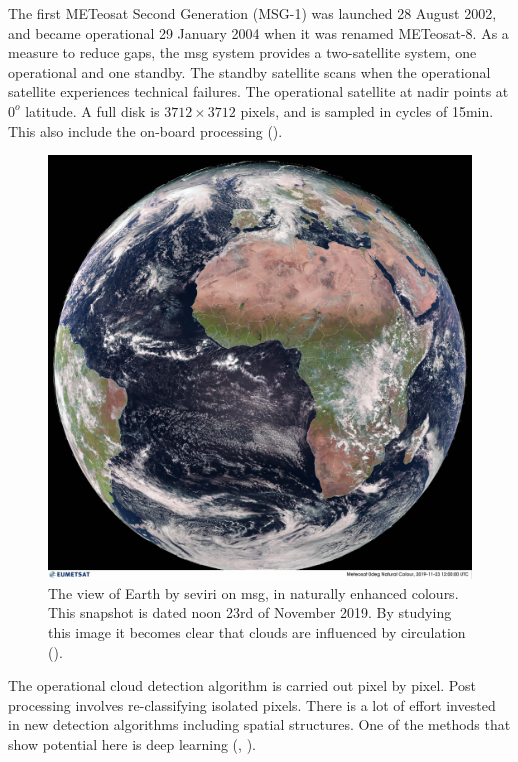 The first METeosat Second Generation (MSG-1) was launched 28 August 2002, and became operational 29 January 2004 when it was renamed METeosat-8. As a measure to reduce gaps, the \acrshort{msg} system provides a two-satellite system, one operational and one standby. The standby satellite scans when the operational satellite experiences technical failures. 
The operational satellite at nadir points at $0^o$ latitude. A full disk is $3712\times 3712$ pixels, and is sampled in cycles of 15min. This also include the on-board processing (\cite{Schmetz_meteosat_intro}).

\begin{figure}[h]
    \centering
    \includegraphics[scale=0.11]{Chapter2_Theory/images/MET10_RGBNatColourEnhncd_FullResolution_20191123120000.jpg}
    \caption{The view of Earth by \acrshort{seviri} on \acrshort{msg}, in naturally enhanced colours. This snapshot is dated noon 23rd of November 2019. By studying this image it becomes clear that clouds are influenced by circulation  (\cite{eumetcast_image_gallery}).}
    \label{fig:sat_view}
\end{figure}
The operational cloud detection algorithm is carried out pixel by pixel. Post processing involves re-classifying isolated pixels. There is a lot of effort invested in new detection algorithms including spatial structures. One of the methods that show potential here is deep learning (\cite{Dronner2018FastNetworks}, \cite{jeppesen_deep_cloud_masking}).

